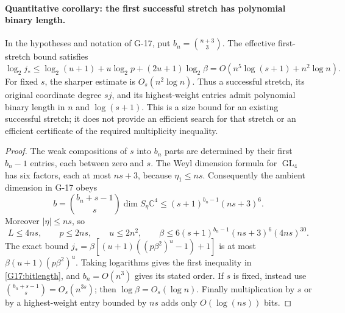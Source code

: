\paragraph{Quantitative corollary: the first successful stretch has polynomial binary length.}
In the hypotheses and notation of G-17, put
$b_n=\binom{n+3}{3}$. The effective first-stretch bound satisfies
\begin{equation}\label{G17:bitlength}
 \log_2j_*
 \leq\log_2(u+1)+u\log_2p+(2u+1)\log_2\beta
 =O\!\left(n^5\log(s+1)+n^2\log n\right).
\end{equation}
For fixed $s$, the sharper estimate is $O_s(n^2\log n)$.
Thus a successful stretch, its original coordinate degree $sj$, and
its highest-weight entries admit polynomial binary length in $n$ and
$\log(s+1)$. This is a size bound for an existing successful stretch;
it does not provide an efficient search for that stretch or an efficient
certificate of the required multiplicity inequality.

\begin{proof}
The weak compositions of $s$ into $b_n$ parts are determined by their
first $b_n-1$ entries, each between zero and $s$. The Weyl dimension
formula for $\operatorname{GL}_4$ has six factors, each at most $ns+3$,
because $\eta_1\leq ns$. Consequently the ambient dimension in G-17 obeys
\[
 b=\binom{b_n+s-1}{s}\dim S_\eta\mathbb C^4
   \leq(s+1)^{b_n-1}(ns+3)^6.
\]
Moreover $|\eta|\leq ns$, so
\[
 L\leq4ns,\qquad p\leq2ns,\qquad u\leq2n^2,
 \qquad
 \beta\leq6(s+1)^{b_n-1}(ns+3)^6(4ns)^{30}.
\]
The exact bound
$j_*=\beta[(u+1)((p\beta^2)^u-1)+1]$
is at most $\beta(u+1)(p\beta^2)^u$. Taking logarithms gives
the first inequality in \eqref{G17:bitlength}, and $b_n=O(n^3)$
gives its stated order. If $s$ is fixed, instead use
$\binom{b_n+s-1}{s}=O_s(n^{3s})$; then $\log\beta=O_s(\log n)$.
Finally multiplication by $s$ or by a highest-weight entry bounded
by $ns$ adds only $O(\log(ns))$ bits.
\end{proof}

